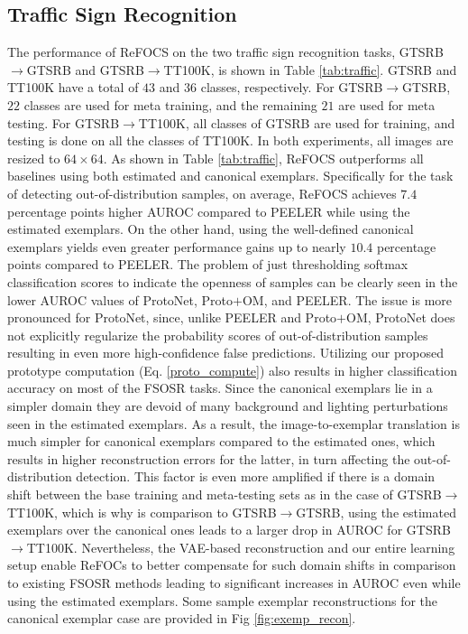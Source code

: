 \subsection{Traffic Sign Recognition}
The performance of ReFOCS on the two traffic sign recognition tasks, GTSRB$\rightarrow$GTSRB and GTSRB$\rightarrow$TT100K, is shown in Table \ref{tab:traffic}. GTSRB and TT100K have a total of $43$ and $36$ classes, respectively. For GTSRB$\rightarrow$GTSRB, $22$ classes are used for meta training, and the remaining $21$ are used for meta testing. For GTSRB$\rightarrow$TT100K, all classes of GTSRB are used for training, and testing is done on all the classes of TT100K. In both experiments, all images are resized to $64 \times 64$. As shown in Table \ref{tab:traffic}, ReFOCS outperforms all baselines using both estimated and canonical exemplars. Specifically for the task of detecting out-of-distribution samples, on average, ReFOCS achieves $\mathbf{7.4}$ percentage points higher AUROC compared to PEELER while using the estimated exemplars. On the other hand, using the well-defined canonical exemplars yields even greater performance gains up to nearly $\mathbf{10.4}$ percentage points compared to PEELER. The problem of just thresholding softmax classification scores to indicate the openness of samples can be clearly seen in the lower AUROC values of ProtoNet, Proto$+$OM, and PEELER. The issue is more pronounced for ProtoNet, since, unlike PEELER and Proto$+$OM, ProtoNet does not explicitly regularize the probability scores of out-of-distribution samples resulting in even more high-confidence false predictions. Utilizing our proposed prototype computation (Eq. \ref{proto_compute}) also results in higher classification accuracy on most of the FSOSR tasks. Since the canonical exemplars lie in a simpler domain they are devoid of many background and lighting perturbations seen in the estimated exemplars. As a result, the image-to-exemplar translation is much simpler for canonical exemplars compared to the estimated ones, which results in higher reconstruction errors for the latter, in turn affecting the out-of-distribution detection. This factor is even more amplified if there is a domain shift between the base training and meta-testing sets as in the case of GTSRB$\rightarrow$TT100K, which is why is comparison to GTSRB$\rightarrow$GTSRB, using the estimated exemplars over the canonical ones leads to a larger drop in AUROC for GTSRB$\rightarrow$TT100K. Nevertheless, the VAE-based reconstruction and our entire learning setup enable ReFOCs to better compensate for such domain shifts in comparison to existing FSOSR methods leading to significant increases in AUROC even while using the estimated exemplars.  Some sample exemplar reconstructions for the canonical exemplar case are provided in Fig \ref{fig:exemp_recon}.

